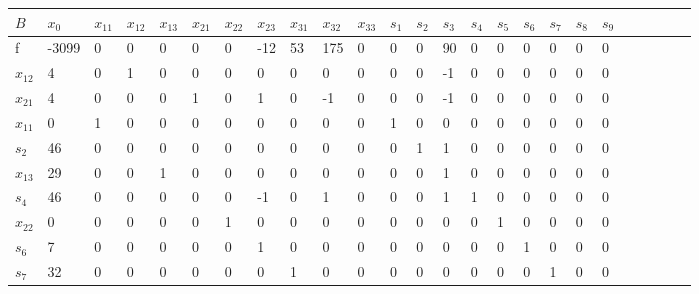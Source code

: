 \documentclass[a4paper]{article}
\theoremstyle{definition}
\theoremstyle{remark}
\begin{document}
\begin{table}[h]
	\begin{tabular}{|l|l|l|l|l|l|l|l|l|l|l|l|l|l|l|l|l|l|l|l|l|l|l|l|l|}
		\hline
		$B$      & $x_0$ & $x_{11}$ & $x_{12}$ & $x_{13}$ & $x_{21}$ & $x_{22}$ & $x_{23}$ & $x_{31}$ & $x_{32}$ & $x_{33}$ & $s_1$ & $s_2$ & $s_3$ & $s_4$ & $s_5$ & $s_6$ & $s_7$ & $s_8$ & $s_9$ \\ \hline\hline
		f        & -3099 & 0        & 0        & 0        & 0        & 0        & -12      & 53       & 175      & 0        & 0     & 0     & 90    & 0     & 0     & 0     & 0     & 0     & 0     \\ \hline\hline
		$x_{12}$ & 4     & 0        & 1        & 0        & 0        & 0        & 0        & 0        & 0        & 0        & 0     & 0     & -1    & 0     & 0     & 0     & 0     & 0     & 0     \\ \hline
		$x_{21}$ & 4     & 0        & 0        & 0        & 1        & 0        & 1        & 0        & -1       & 0        & 0     & 0     & -1    & 0     & 0     & 0     & 0     & 0     & 0     \\ \hline
		$x_{11}$ & 0     & 1        & 0        & 0        & 0        & 0        & 0        & 0        & 0        & 0        & 1     & 0     & 0     & 0     & 0     & 0     & 0     & 0     & 0     \\ \hline
		$s_{2}$  & 46    & 0        & 0        & 0        & 0        & 0        & 0        & 0        & 0        & 0        & 0     & 1     & 1     & 0     & 0     & 0     & 0     & 0     & 0     \\ \hline
		$x_{13}$ & 29    & 0        & 0        & 1        & 0        & 0        & 0        & 0        & 0        & 0        & 0     & 0     & 1     & 0     & 0     & 0     & 0     & 0     & 0     \\ \hline
		$s_4$    & 46    & 0        & 0        & 0        & 0        & 0        & -1       & 0        & 1        & 0        & 0     & 0     & 1     & 1     & 0     & 0     & 0     & 0     & 0     \\ \hline
		$x_{22}$ & 0     & 0        & 0        & 0        & 0        & 1        & 0        & 0        & 0        & 0        & 0     & 0     & 0     & 0     & 1     & 0     & 0     & 0     & 0     \\ \hline
		$s_6$    & 7     & 0        & 0        & 0        & 0        & 0        & 1        & 0        & 0        & 0        & 0     & 0     & 0     & 0     & 0     & 1     & 0     & 0     & 0     \\ \hline
		$s_7$    & 32    & 0        & 0        & 0        & 0        & 0        & 0        & 1        & 0        & 0        & 0     & 0     & 0     & 0     & 0     & 0     & 1     & 0     & 0     \\ \hline

\end{tabular}
\end{table}
\end{document}
